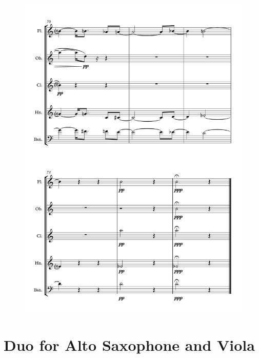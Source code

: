 \begin{figure}[H]
    \centering
	\includegraphics[width=6.5in]{figures/Out_of_Focus_15.pdf}
\end{figure}

\chapter{Duo for Alto Saxophone and Viola}

